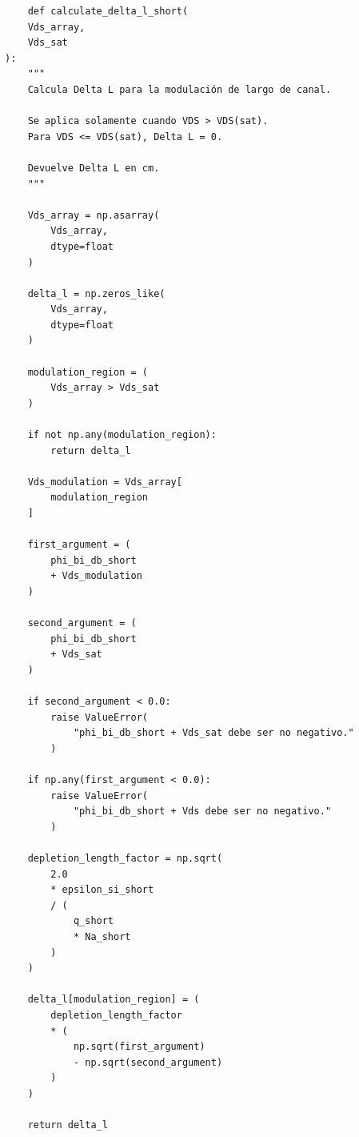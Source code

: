 \documentclass[a4paper, twoside, 10pt, spanish]{article}
\numberwithin{table}{section}
\begin{document}
\begin{verbatim}
    def calculate_delta_l_short(
    Vds_array,
    Vds_sat
):
    """
    Calcula Delta L para la modulación de largo de canal.

    Se aplica solamente cuando VDS > VDS(sat).
    Para VDS <= VDS(sat), Delta L = 0.

    Devuelve Delta L en cm.
    """

    Vds_array = np.asarray(
        Vds_array,
        dtype=float
    )

    delta_l = np.zeros_like(
        Vds_array,
        dtype=float
    )

    modulation_region = (
        Vds_array > Vds_sat
    )

    if not np.any(modulation_region):
        return delta_l

    Vds_modulation = Vds_array[
        modulation_region
    ]

    first_argument = (
        phi_bi_db_short
        + Vds_modulation
    )

    second_argument = (
        phi_bi_db_short
        + Vds_sat
    )

    if second_argument < 0.0:
        raise ValueError(
            "phi_bi_db_short + Vds_sat debe ser no negativo."
        )

    if np.any(first_argument < 0.0):
        raise ValueError(
            "phi_bi_db_short + Vds debe ser no negativo."
        )

    depletion_length_factor = np.sqrt(
        2.0
        * epsilon_si_short
        / (
            q_short
            * Na_short
        )
    )

    delta_l[modulation_region] = (
        depletion_length_factor
        * (
            np.sqrt(first_argument)
            - np.sqrt(second_argument)
        )
    )

    return delta_l
\end{verbatim}
\end{document}
